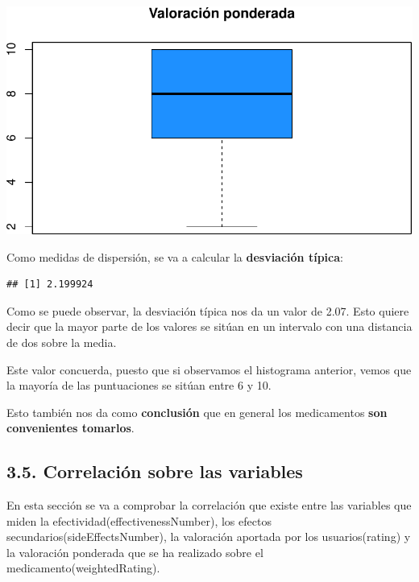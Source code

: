 \documentclass[spanish,]{article}
\newenvironment{Shaded}{\begin{snugshade}}{\end{snugshade}}
\newcommand{\KeywordTok}[1]{\textcolor[rgb]{0.13,0.29,0.53}{\textbf{#1}}}
\newcommand{\CommentTok}[1]{\textcolor[rgb]{0.56,0.35,0.01}{\textit{#1}}}
\newcommand{\OperatorTok}[1]{\textcolor[rgb]{0.81,0.36,0.00}{\textbf{#1}}}
\newcommand{\NormalTok}[1]{#1}
\begin{document}
\includegraphics{practica-original_files/figure-latex/unnamed-chunk-114-1.pdf}

Como medidas de dispersión, se va a calcular la \textbf{desviación
típica}:

\begin{Shaded}
\end{Shaded}

\begin{verbatim}
## [1] 2.199924
\end{verbatim}

Como se puede observar, la desviación típica nos da un valor de 2.07.
Esto quiere decir que la mayor parte de los valores se sitúan en un
intervalo con una distancia de dos sobre la media.

Este valor concuerda, puesto que si observamos el histograma anterior,
vemos que la mayoría de las puntuaciones se sitúan entre 6 y 10.

Esto también nos da como \textbf{conclusión} que en general los
medicamentos \textbf{son convenientes tomarlos}.

\subsection{3.5. Correlación sobre las
variables}\label{correlacion-sobre-las-variables}

En esta sección se va a comprobar la correlación que existe entre las
variables que miden la efectividad(effectivenessNumber), los efectos
secundarios(sideEffectsNumber), la valoración aportada por los
usuarios(rating) y la valoración ponderada que se ha realizado sobre el
medicamento(weightedRating).
\end{document}
